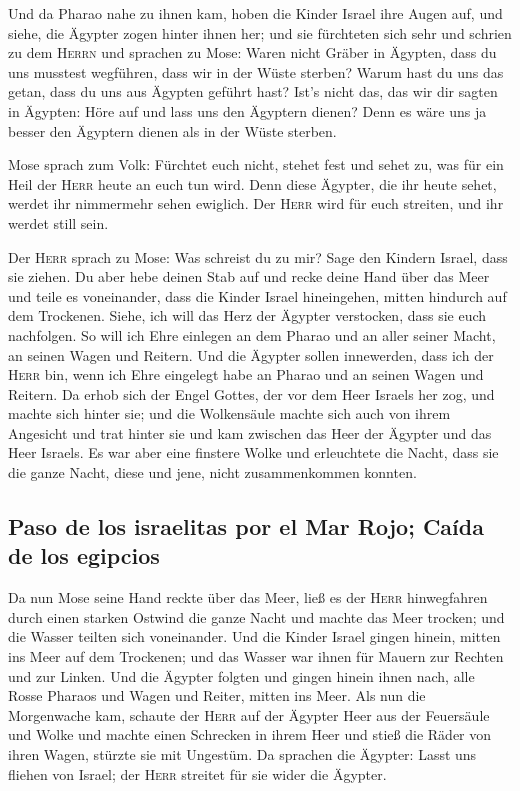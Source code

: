  Und da Pharao nahe zu ihnen kam, hoben die Kinder Israel
ihre Augen auf, und siehe, die Ägypter zogen hinter ihnen her; und sie
fürchteten sich sehr und schrien zu dem \textsc{Herrn} 
und sprachen zu Mose: Waren nicht Gräber in Ägypten, dass du uns
musstest wegführen, dass wir in der Wüste sterben? Warum hast du uns das
getan, dass du uns aus Ägypten geführt hast?  Ist's nicht
das, das wir dir sagten in Ägypten: Höre auf und lass uns den Ägyptern
dienen? Denn es wäre uns ja besser den Ägyptern dienen als in der Wüste
sterben.

 Mose sprach zum Volk: Fürchtet euch nicht, stehet fest
und sehet zu, was für ein Heil der \textsc{Herr} heute an euch tun wird.
Denn diese Ägypter, die ihr heute sehet, werdet ihr nimmermehr sehen
ewiglich.  Der \textsc{Herr} wird für euch streiten, und
ihr werdet still sein.

 Der \textsc{Herr} sprach zu Mose: Was schreist du zu
mir? Sage den Kindern Israel, dass sie ziehen.  Du aber
hebe deinen Stab auf und recke deine Hand über das Meer und teile es
voneinander, dass die Kinder Israel hineingehen, mitten hindurch auf dem
Trockenen.  Siehe, ich will das Herz der Ägypter
verstocken, dass sie euch nachfolgen. So will ich Ehre einlegen an dem
Pharao und an aller seiner Macht, an seinen Wagen und Reitern.
 Und die Ägypter sollen innewerden, dass ich der
\textsc{Herr} bin, wenn ich Ehre eingelegt habe an Pharao und an seinen
Wagen und Reitern.  Da erhob sich der Engel Gottes, der
vor dem Heer Israels her zog, und machte sich hinter sie; und die
Wolkensäule machte sich auch von ihrem Angesicht und trat hinter sie
 und kam zwischen das Heer der Ägypter und das Heer
Israels. Es war aber eine finstere Wolke und erleuchtete die Nacht, dass
sie die ganze Nacht, diese und jene, nicht zusammenkommen konnten.

\hypertarget{paso-de-los-israelitas-por-el-mar-rojo-cauxedda-de-los-egipcios}{%
\subsection{Paso de los israelitas por el Mar Rojo; Caída de los
egipcios}\label{paso-de-los-israelitas-por-el-mar-rojo-cauxedda-de-los-egipcios}}

 Da nun Mose seine Hand reckte über das Meer, ließ es der
\textsc{Herr} hinwegfahren durch einen starken Ostwind die ganze Nacht
und machte das Meer trocken; und die Wasser teilten sich voneinander.
 Und die Kinder Israel gingen hinein, mitten ins Meer auf
dem Trockenen; und das Wasser war ihnen für Mauern zur Rechten und zur
Linken.  Und die Ägypter folgten und gingen hinein ihnen
nach, alle Rosse Pharaos und Wagen und Reiter, mitten ins Meer.
 Als nun die Morgenwache kam, schaute der \textsc{Herr}
auf der Ägypter Heer aus der Feuersäule und Wolke und machte einen
Schrecken in ihrem Heer  und stieß die Räder von ihren
Wagen, stürzte sie mit Ungestüm. Da sprachen die Ägypter: Lasst uns
fliehen von Israel; der \textsc{Herr} streitet für sie wider die
Ägypter.

